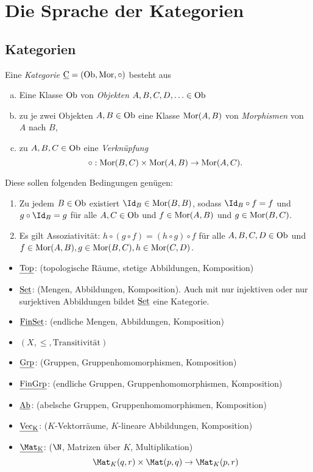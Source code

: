 \chapter{Die Sprache der Kategorien}



\section{Kategorien}


\begin{df}
	Eine \emph{Kategorie} $\underline{\mathrm{C}} = (\mathrm{Ob}, \operatorname{Mor}, \circ)$ besteht aus
	\begin{enumerate}[a)]
		\item
			Eine Klasse $\mathrm{Ob}$ von \emph{Objekten} $A, B, C, D, \dotsc \in \mathrm{Ob}$
		\item
			zu je zwei Objekten $A, B \in \mathrm{Ob}$ eine Klasse $\operatorname{Mor}(A,B)$ von \emph{Morphismen} von $A$ nach $B$,
		\item
			zu $A, B, C \in \mathrm{Ob}$ eine \emph{Verknüpfung}
			\[
				\circ: \operatorname{Mor}(B, C) \times \operatorname{Mor}(A, B) \to \operatorname{Mor}(A, C).
			\]
	\end{enumerate}
	Diese sollen folgenden Bedingungen genügen:
	\begin{enumerate}[1)]
		\item
			Zu jedem $B \in \mathrm{Ob}$ existiert $\Id_B \in \Mor(B, B)$, sodass $\Id_B \circ f = f$ und $g \circ \Id_B = g$ für alle $A, C \in \mathrm{Ob}$ und $f \in \operatorname{Mor}(A, B)$ und $g \in \operatorname{Mor}(B, C)$.
		\item
			Es gilt Assoziativität: $h \circ (g \circ f) = (h \circ g) \circ f$ für alle $A, B, C, D \in \mathrm{Ob}$ und $f \in \operatorname{Mor}(A, B), g \in \operatorname{Mor}(B, C), h \in \operatorname{Mor}(C, D)$.
	\end{enumerate}
\end{df}

\begin{ex}
	\begin{itemize}
		\item
			$\underline{\mathrm{Top}}$: (topologische Räume, stetige Abbildungen, Komposition)
		\item
			$\underline{\mathrm{Set}}$: (Mengen, Abbildungen, Komposition).
			Auch mit nur injektiven oder nur surjektiven Abbildungen bildet $\underline{\mathrm{Set}}$ eine Kategorie.
		\item
			$\underline{\mathrm{FinSet}}$: (endliche Mengen, Abbildungen, Komposition)
		\item
			$(X, \le, \text{Transitivität})$
		\item
			$\underline{\mathrm{Grp}}$: (Gruppen, Gruppenhomomorphismen, Komposition)
		\item
			$\underline{\mathrm{FinGrp}}$: (endliche Gruppen, Gruppenhomomorphismen, Komposition)
		\item
			$\underline{\mathrm{Ab}}$: (abelsche Gruppen, Gruppenhomomorphismen, Komposition)
		\item
			$\underline{\mathrm{\operatorname{Vec}_K}}$: ($K$-Vektorräume, $K$-lineare Abbildungen, Komposition)
		\item
			$\Cat{\Mat_K}$: ($\N$, Matrizen über $K$, Multiplikation)
			\[
				\Mat_K(q,r) \times \Mat(p,q) \to \Mat_K(p,r)
			\]
	\end{itemize}
\end{ex}

